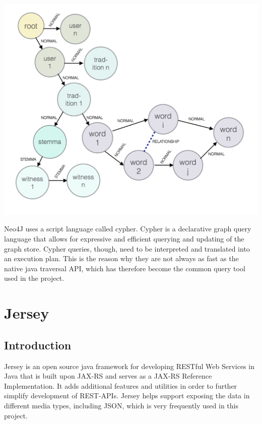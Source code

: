 \documentclass[11pt,fleqn,openany]{book} %
\begin{document}
\begin{center}
\includegraphics[scale=.5]{Pictures/database.png} 
\end{center} 
Neo4J uses a script language called cypher. Cypher is a declarative graph query language that allows for expressive and efficient querying and updating of the graph store. Cypher queries, though, need to be interpreted and translated into an execution plan. This is the reason why they are not always as fast as the native java traversal API, which has therefore become the common query tool used in the project.




\chapter{Jersey}

\section*{Introduction}
Jersey is an open source java framework for developing RESTful Web Services in Java that is built upon JAX-RS and serves as a JAX-RS Reference Implementation. It adds additional features and utilities in order to further simplify development of REST-APIs. Jersey helps support exposing the data in different media types, including JSON, which is very frequently used in this project. 
\end{document}
